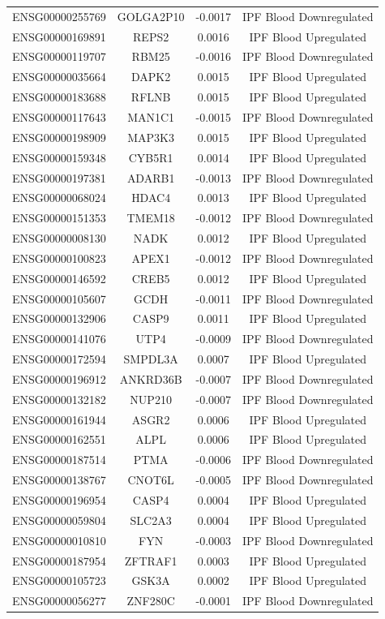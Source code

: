 \documentclass[
]{article}
\begin{document}
\begin{singlespace}
\begin{longtable}[t]{lccc}
ENSG00000255769 & GOLGA2P10 & -0.0017 & IPF Blood Downregulated\\
ENSG00000169891 & REPS2 & 0.0016 & IPF Blood Upregulated\\
\addlinespace
ENSG00000119707 & RBM25 & -0.0016 & IPF Blood Downregulated\\
ENSG00000035664 & DAPK2 & 0.0015 & IPF Blood Upregulated\\
ENSG00000183688 & RFLNB & 0.0015 & IPF Blood Upregulated\\
ENSG00000117643 & MAN1C1 & -0.0015 & IPF Blood Downregulated\\
ENSG00000198909 & MAP3K3 & 0.0015 & IPF Blood Upregulated\\
\addlinespace
ENSG00000159348 & CYB5R1 & 0.0014 & IPF Blood Upregulated\\
ENSG00000197381 & ADARB1 & -0.0013 & IPF Blood Downregulated\\
ENSG00000068024 & HDAC4 & 0.0013 & IPF Blood Upregulated\\
ENSG00000151353 & TMEM18 & -0.0012 & IPF Blood Downregulated\\
ENSG00000008130 & NADK & 0.0012 & IPF Blood Upregulated\\
\addlinespace
ENSG00000100823 & APEX1 & -0.0012 & IPF Blood Downregulated\\
ENSG00000146592 & CREB5 & 0.0012 & IPF Blood Upregulated\\
ENSG00000105607 & GCDH & -0.0011 & IPF Blood Downregulated\\
ENSG00000132906 & CASP9 & 0.0011 & IPF Blood Upregulated\\
ENSG00000141076 & UTP4 & -0.0009 & IPF Blood Downregulated\\
\addlinespace
ENSG00000172594 & SMPDL3A & 0.0007 & IPF Blood Upregulated\\
ENSG00000196912 & ANKRD36B & -0.0007 & IPF Blood Downregulated\\
ENSG00000132182 & NUP210 & -0.0007 & IPF Blood Downregulated\\
ENSG00000161944 & ASGR2 & 0.0006 & IPF Blood Upregulated\\
ENSG00000162551 & ALPL & 0.0006 & IPF Blood Upregulated\\
\addlinespace
ENSG00000187514 & PTMA & -0.0006 & IPF Blood Downregulated\\
ENSG00000138767 & CNOT6L & -0.0005 & IPF Blood Downregulated\\
ENSG00000196954 & CASP4 & 0.0004 & IPF Blood Upregulated\\
ENSG00000059804 & SLC2A3 & 0.0004 & IPF Blood Upregulated\\
ENSG00000010810 & FYN & -0.0003 & IPF Blood Downregulated\\
\addlinespace
ENSG00000187954 & ZFTRAF1 & 0.0003 & IPF Blood Upregulated\\
ENSG00000105723 & GSK3A & 0.0002 & IPF Blood Upregulated\\
ENSG00000056277 & ZNF280C & -0.0001 & IPF Blood Downregulated\\*
\end{longtable}
\endgroup{}




\end{singlespace}
\end{document}
